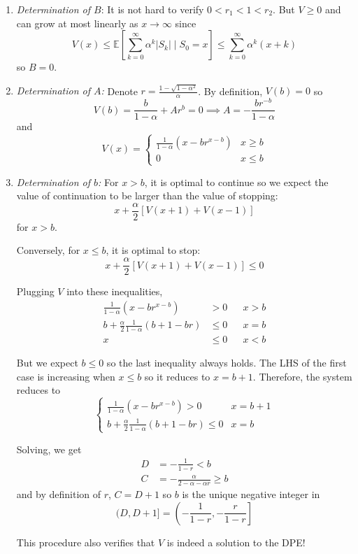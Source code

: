 \documentclass[12pt]{report}
\newcommand{\E}{\mathbb{E}}
\newcommand{\abs}[1]{\left\vert #1 \right\vert}
\begin{document}
    \begin{enumerate}
        \item \emph{Determination of $B$}: It is not hard to verify $0 < r_1 < 1 < r_2$. But $V \geq 0$ and can grow at most linearly as $x \to \infty$ since 
        \[V(x) \leq \E[\sum_{k=0}^\infty \alpha^k \abs{S_k} \; | \; S_0 = x] \leq \sum_{k=0}^\infty \alpha^k(x + k)\]
        so $B = 0$.

        \item \emph{Determination of $A$:} Denote $r = \frac{1 - \sqrt{1 - \alpha^2}}{\alpha}$. By definition, $V(b) = 0$ so 
        \[V(b) = \frac{b}{1 - \alpha} + Ar^b = 0 \implies A = - \frac{br^{-b}}{1 - \alpha}\]
        and 
        \[V(x) = \begin{cases}
            \frac{1}{1 - \alpha} (x - br^{x - b}) & x \geq b\\ 
            0 & x \leq b
        \end{cases}\] 

        \item \emph{Determination of $b$:} For $x > b$, it is optimal to continue so we expect the value of continuation to be larger than the value of stopping:
        \[x + \frac{\alpha}{2}[V(x + 1) + V(x - 1)]\]
        for $x > b$.

        Conversely, for $x \leq b$, it is optimal to stop:
        \[x + \frac{\alpha}{2}[V(x + 1) + V(x - 1)] \leq 0\]

        Plugging $V$ into these inequalities, 
        \begin{align*}
            \frac{1}{1 - \alpha} (x - br^{x- b}) &> 0 && x > b\\ 
            b + \frac{\alpha}{2} \frac{1}{1 - \alpha} (b+ 1  -br) &\leq 0 && x = b\\ 
            x &\leq 0 && x < b
        \end{align*}

        But we expect $b \leq 0$ so the last inequality always holds. The LHS of the first case is increasing when $x \leq b$ so it reduces to $x = b + 1$. Therefore, the system reduces to 
        \[\begin{cases}
            \frac{1}{1 - \alpha} (x - br^{x- b}) > 0 & x = b + 1\\ 
            b + \frac{\alpha}{2} \frac{1}{1 - \alpha} (b+ 1  -br) \leq 0 & x = b
        \end{cases}\]

        Solving, we get 
        \begin{align*}
            D &= -\frac{1}{1 - r} < b\\ 
            C &= -\frac{\alpha}{2 - \alpha - \alpha r} \geq b
        \end{align*}
        and by definition of $r$, $C = D + 1$ so $b$ is the unique negative integer in 
        \[(D, D+1] = \left(-\frac{1}{1 - r}, -\frac{r}{1 - r}\right]\]

        This procedure also verifies that $V$ is indeed a solution to the DPE! 

    \end{enumerate}
\end{document}
